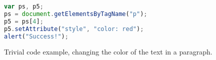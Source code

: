 \lstset{numbers=left,xleftmargin=2em,frame=single,framexleftmargin=1.5em}
\begin{figure}[h]
\begin{lstlisting}[language=javascript]
var ps, p5;
ps = document.getElementsByTagName("p");
p5 = ps[4];
p5.setAttribute("style", "color: red");
alert("Success!");
\end{lstlisting}
\caption{Trivial \JS code example, changing the color of the text in a paragraph.}
\label{fig:trivial-js}
\end{figure}
